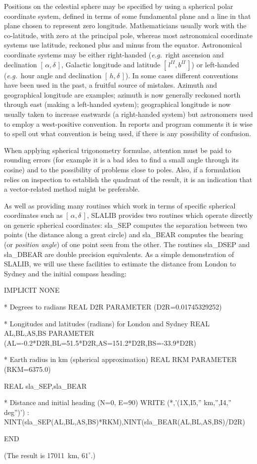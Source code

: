 \documentclass[11pt,twoside,nolof]{starlink}
\providecommand{\radec}     {$[\,\alpha,\delta\,]$}
\providecommand{\hadec}     {$[\,h,\delta\,]$}
\providecommand{\gal}       {$[\,l^{I\!I},b^{I\!I}\,]$}
\begin{document}
Positions on the celestial sphere may be specified by using
a spherical polar coordinate system, defined in terms of
some fundamental plane and a line in that plane chosen to
represent zero longitude.  Mathematicians usually work with the
co-latitude, with zero at the principal pole, whereas most
astronomical coordinate systems use latitude, reckoned plus and
minus from the equator.
Astronomical coordinate systems may be either right-handed
(\textit{e.g.}\ right ascension and declination \radec,
Galactic longitude and latitude \gal)
or left-handed (\textit{e.g.}\ hour angle and
declination \hadec).  In some cases
different conventions have been used in the past, a fruitful source of
mistakes.  Azimuth and geographical longitude are examples;  azimuth
is now generally reckoned north through east
(making a left-handed system);  geographical longitude is now usually
taken to increase eastwards (a right-handed system) but astronomers
used to employ a west-positive convention.  In reports
and program comments it is wise to spell out what convention
is being used, if there is any possibility of confusion.

When applying spherical trigonometry formulae, attention must be
paid to
rounding errors (for example it is a bad idea to find a
small angle through its cosine) and to the possibility of
problems close to poles.
Also, if a formulation relies on inspection to establish
the quadrant of the result, it is an indication that a vector-related
method might be preferable.

As well as providing many routines which work in terms of specific
spherical coordinates such as \radec, SLALIB provides
two routines which operate directly on generic spherical
coordinates:
sla\_SEP
computes the separation between
two points (the distance along a great circle) and
sla\_BEAR
computes the bearing (or \textit{position angle})
of one point seen from the other.  The routines
sla\_DSEP
and
sla\_DBEAR
are double precision equivalents.  As a simple demonstration
of SLALIB, we will use these facilities to estimate the distance from
London to Sydney and the initial compass heading:
\goodbreak
\begin{terminalv}
            IMPLICIT NONE

      *  Degrees to radians
            REAL D2R
            PARAMETER (D2R=0.01745329252)

      *  Longitudes and latitudes (radians) for London and Sydney
            REAL AL,BL,AS,BS
            PARAMETER (AL=-0.2*D2R,BL=51.5*D2R,AS=151.2*D2R,BS=-33.9*D2R)

      *  Earth radius in km (spherical approximation)
            REAL RKM
            PARAMETER (RKM=6375.0)

            REAL sla_SEP,sla_BEAR


      *  Distance and initial heading (N=0, E=90)
            WRITE (*,'(1X,I5,'' km,'',I4,'' deg'')')
           :    NINT(sla_SEP(AL,BL,AS,BS)*RKM),NINT(sla_BEAR(AL,BL,AS,BS)/D2R)

            END
\end{terminalv}
\goodbreak
(The result is 17011~km, $61^\circ$.)
\end{document}

